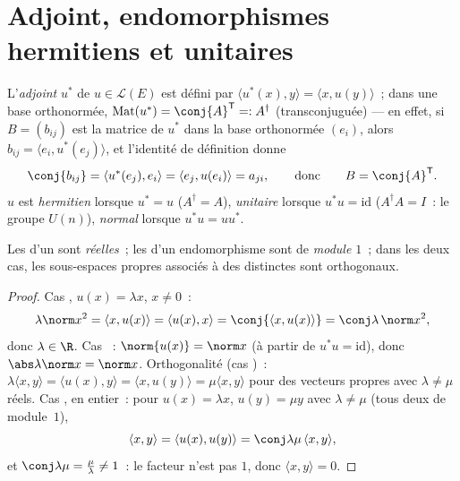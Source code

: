 \section{Adjoint, endomorphismes hermitiens et unitaires}

\begin{definition}\label{def:b2:hermitian:adjoint}
L'\emph{adjoint} $u^*$ de $u \in \mathcal{L}(E)$ est défini par
$\langle u^*(x), y\rangle = \langle x, u(y)\rangle$~; dans une base
orthonormée, $\operatorname{Mat}(u^*) = \conj{A}^{\mathsf T} =:
A^{\dagger}$ (transconjuguée) --- en effet, si $B =
(b_{ij})$ est la matrice de $u^*$ dans la base orthonormée
$(e_i)$, alors $b_{ij} = \langle e_i, u^*(e_j)\rangle$, et
l'identité de définition donne
\[
\conj{b_{ij}}
= \langle u^*(e_j), e_i\rangle
= \langle e_j, u(e_i)\rangle = a_{ji} ,
\qquad\text{donc}\qquad
B = \conj{A}^{\mathsf T} .
\] $u$ est
\emph{hermitien} lorsque $u^* = u$
($A^\dagger = A$), \emph{unitaire} lorsque $u^*u =
\mathrm{id}$ ($A^\dagger A = I$~: le groupe $U(n)$), \emph{normal}
lorsque $u^*u = uu^*$.
\end{definition}

\begin{proposition}\label{prop:b2:hermitian:eigenvalues}
Les  d'un  sont \emph{réelles}~;
les  d'un endomorphisme  sont de \emph{module
$1$}~; dans les deux cas, les sous-espaces propres associés à des
 distinctes sont orthogonaux.
\end{proposition}

\begin{proof}
Cas , $u(x) = \lambda x$, $x \neq 0$~:
\[
\lambda \norm x^2 = \langle x, u(x)\rangle = \langle u(x), x\rangle
= \conj{\langle x, u(x)\rangle} = \conj\lambda\,\norm x^2 ,
\]
donc $\lambda \in \R$. Cas ~: $\norm{u(x)} = \norm x$ (à
partir de $u^*u = \mathrm{id}$), donc $\abs\lambda\norm x = \norm x$.
Orthogonalité (cas )~: $\lambda\langle x, y\rangle = \langle
u(x), y\rangle = \langle x, u(y)\rangle = \mu\langle x, y\rangle$ pour
des vecteurs propres avec $\lambda \neq \mu$ réels. Cas , en
entier~: pour $u(x) = \lambda x$, $u(y) = \mu y$ avec $\lambda \neq
\mu$ (tous deux de module~$1$),
\[
\langle x, y\rangle = \langle u(x), u(y)\rangle
= \conj\lambda\mu\,\langle x, y\rangle ,
\]
et $\conj\lambda\mu = \frac{\mu}{\lambda} \neq 1$~: le facteur
n'est pas $1$, donc $\langle x, y\rangle = 0$.
\end{proof}


